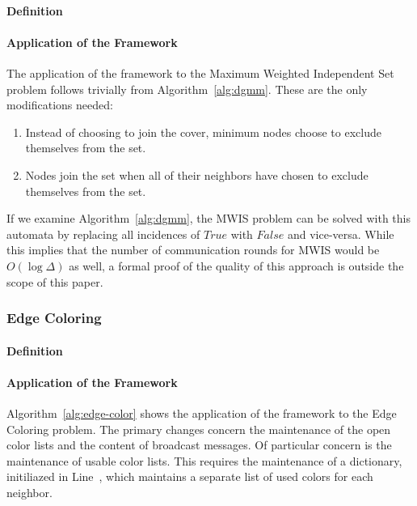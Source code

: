 \documentclass[conference, 10pt, letter]{IEEEtran}
\begin{document}
\paragraph{Definition}

\paragraph{Application of the Framework}

The application of the framework to the Maximum Weighted Independent Set problem follows trivially from Algorithm~\ref{alg:dgmm}. These are the only modifications needed:

\begin{enumerate}
\item Instead of choosing to join the cover, minimum nodes choose to exclude themselves from the set.
\item Nodes join the set when all of their neighbors have chosen to exclude themselves from the set.\label{en:modlist-lastline}
\end{enumerate}

If we examine Algorithm~\ref{alg:dgmm}, the MWIS problem can be solved with this automata by replacing all incidences of $True$ with $False$ and vice-versa. While this implies that the number of communication rounds for MWIS would be $O(\log \Delta)$ as well, a formal proof of the quality of this approach is outside the scope of this paper.

\subsubsection{Edge Coloring}
\label{ssb:algorithms-other-ec}
\paragraph{Definition}

\paragraph{Application of the Framework}
\label{par:apply-edge-color}

Algorithm~\ref{alg:edge-color} shows the application of the framework to the Edge Coloring problem. The primary changes concern the maintenance of the open color lists and the content of broadcast messages. Of particular concern is the maintenance of usable color lists. This requires the maintenance of a dictionary, initiliazed in Line~, which maintains a separate list of used colors for each neighbor.
\end{document}
